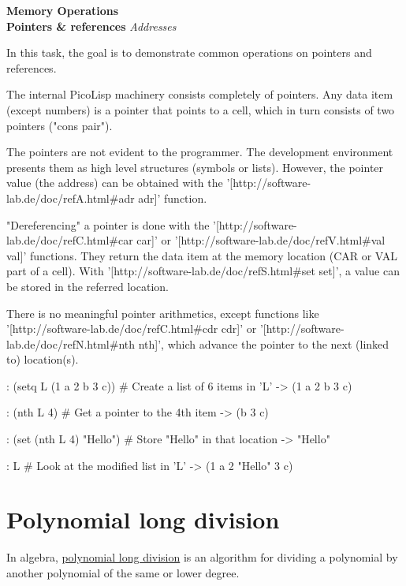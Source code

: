 \textbf{Memory Operations} \\ \textbf{Pointers \& references}
\textbar{} \emph{Addresses}

In this task, the goal is to demonstrate common operations on pointers
and references.


\begin{wideverbatim}

The internal PicoLisp machinery consists completely of pointers. Any data item
(except numbers) is a pointer that points to a cell, which in turn consists of
two pointers ("cons pair").

The pointers are not evident to the programmer. The development environment
presents them as high level structures (symbols or lists). However, the pointer
value (the address) can be obtained with the
'[http://software-lab.de/doc/refA.html#adr adr]' function.

"Dereferencing" a pointer is done with the
'[http://software-lab.de/doc/refC.html#car car]' or
'[http://software-lab.de/doc/refV.html#val val]' functions. They return the data
item at the memory location (CAR or VAL part of a cell). With
'[http://software-lab.de/doc/refS.html#set set]', a value can be stored in the
referred location.

There is no meaningful pointer arithmetics, except functions like
'[http://software-lab.de/doc/refC.html#cdr cdr]' or
'[http://software-lab.de/doc/refN.html#nth nth]', which advance the pointer to
the next (linked to) location(s).

: (setq L (1 a 2 b 3 c))         # Create a list of 6 items in 'L'
-> (1 a 2 b 3 c)

: (nth L 4)                      # Get a pointer to the 4th item
-> (b 3 c)

: (set (nth L 4) "Hello")        # Store "Hello" in that location
-> "Hello"

: L                              # Look at the modified list in 'L'
-> (1 a 2 "Hello" 3 c)

\end{wideverbatim}

\pagebreak{}
\section*{Polynomial long division}

In algebra,
\href{http://en.wikipedia.org/wiki/Polynomial\_long\_division}{polynomial
  long division} is an algorithm for dividing a polynomial by another
polynomial of the same or lower degree.

